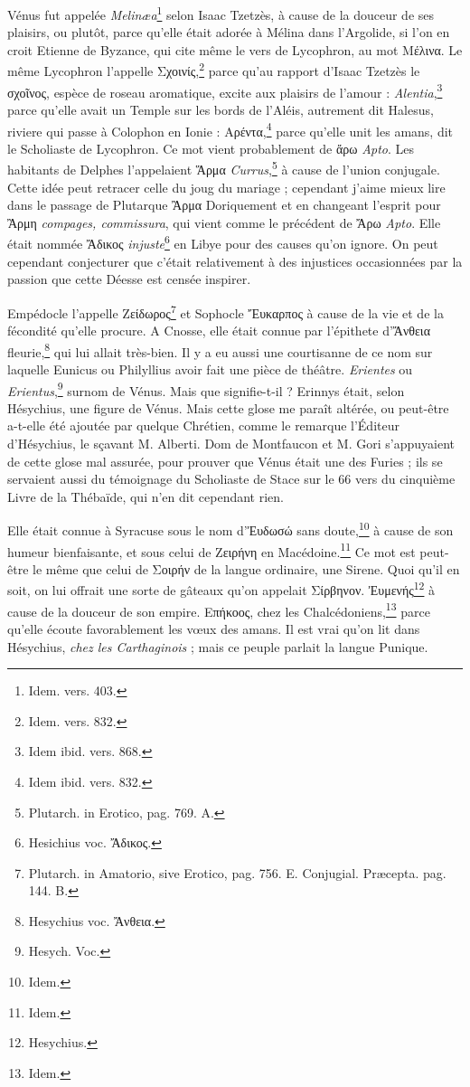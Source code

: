 \documentclass[a4paper, 11pt, oneside, polutonikogreek, french]{article}
\begin{document}
Vénus fut appelée \emph{Melinæa}\footnote{Idem. vers. 403.} selon Isaac Tzetzès, à cause de la douceur de ses plaisirs, ou plutôt, parce qu'elle était adorée à Mélina dans l'Argolide, si l'on en croit Etienne de Byzance, qui cite même le vers de Lycophron, au mot Μέλινα. Le même Lycophron l'appelle Σχοινίς,\footnote{Idem. vers. 832.} parce qu'au rapport d'Isaac Tzetzès le σχοῖνος, espèce de roseau aromatique, excite aux plaisirs de l'amour : \emph{Alentia},\footnote{Idem ibid. vers. 868.} parce qu'elle avait un Temple sur les bords de l'Aléis, autrement dit Halesus, riviere qui passe à Colophon en Ionie : Αρέντα,\footnote{Idem ibid. vers. 832.} parce qu'elle unit les amans, dit le Scholiaste de Lycophron. Ce mot vient probablement de ἄρω \emph{Apto}. Les habitants de Delphes l'appelaient Ἅρμα \emph{Currus},\footnote{Plutarch. in Erotico, pag. 769. A.} à cause de l'union conjugale. Cette idée peut retracer celle du joug du mariage ; cependant j'aime mieux lire dans le passage de Plutarque Ἂρμα Doriquement et en changeant l'esprit pour Ἂρμη \emph{compages, commissura}, qui vient comme le précédent de Ἄρω \emph{Apto}. Elle était nommée Ἄδικος \emph{injuste}\footnote{Hesichius voc. Ἄδικος.} en Libye pour des causes qu'on ignore. On peut cependant conjecturer que c'était relativement à des injustices occasionnées par la passion que cette Déesse est censée inspirer.

Empédocle l'appelle Ζείδωρος\footnote{Plutarch. in Amatorio, sive Erotico, pag. 756. E. Conjugial. Præcepta. pag. 144. B.} et Sophocle Ἔυκαρπος à cause de la vie et de la fécondité qu'elle procure. A Cnosse, elle était connue par l'épithete d'Ἄνθεια fleurie,\footnote{Hesychius voc. Ἄνθεια.} qui lui allait très-bien. Il y a eu aussi une courtisanne de ce nom sur laquelle Eunicus ou Philyllius avoir fait une pièce de théâtre. \emph{Erientes} ou \emph{Erientus},\footnote{Hesych. Voc.} surnom de Vénus. Mais que signifie-t-il ? Erinnys était, selon Hésychius, une figure de Vénus. Mais cette glose me paraît altérée, ou peut-être a-t-elle été ajoutée par quelque Chrétien, comme le remarque l'Éditeur d'Hésychius, le sçavant M. Alberti. Dom de Montfaucon et M. Gori s'appuyaient de cette glose mal assurée, pour prouver que Vénus était une des Furies ; ils se servaient aussi du témoignage du Scholiaste de Stace sur le 66 vers du cinquième Livre de la Thébaïde, qui n'en dit cependant rien.

Elle était connue à Syracuse sous le nom d'Ἐυδωσώ sans doute,\footnote{Idem.} à cause de son humeur bienfaisante, et sous celui de Ζειρήνη en Macédoine.\footnote{Idem.} Ce mot est peut-être le même que celui de Σοιρήν de la langue ordinaire, une Sirene. Quoi qu'il en soit, on lui offrait une sorte de gâteaux qu'on appelait Σίρβηνον. Ἐυμενής\footnote{Hesychius.} à cause de la douceur de son empire. Επήκοος, chez les Chalcédoniens,\footnote{Idem.} parce qu'elle écoute favorablement les vœux des amans. Il est vrai qu'on lit dans Hésychius, \emph{chez les Carthaginois} ; mais ce peuple parlait la langue Punique.
\end{document}
